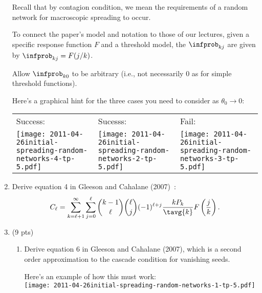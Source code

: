 \begin{enumerate}
  Recall that by contagion condition, we mean
  the requirements of a random network for
  macroscopic spreading to occur.

  To connect the paper's model and notation
  to those of our lectures,
  given a specific response function $F$
  and a threshold model,
  the $\infprob_{kj}$ are given by
  $\infprob_{kj} = F(j/k)$.

  Allow $\infprob_{k0}$ to be arbitrary (i.e., not necessarily
  0 as for simple threshold functions).

  Here's a graphical hint for the three cases 
  you need to consider as $\theta_{0} \rightarrow 0$:
  \begin{tabular}{lll}
    Success: &
    Sucesss: & 
    Fail: \\
    \texttt{[image: 2011-04-26initial-spreading-random-networks-4-tp-5.pdf]} &
    \texttt{[image: 2011-04-26initial-spreading-random-networks-2-tp-5.pdf]} &
    \texttt{[image: 2011-04-26initial-spreading-random-networks-3-tp-5.pdf]}
  \end{tabular}

  
   \solutionstart


   \solutionend

\item 
  Derive equation 4 in Gleeson and Cahalane (2007)~\cite{gleeson2007a}:
  $$
  C_{\ell}
  =
  \sum_{k=\ell+1}^{\infty}
  \sum_{j=0}^{\ell}
  \binom{k-1}{\ell}
  \binom{\ell}{j}
  (-1)^{\ell+j}
  \frac{k P_{k}}{\tavg{k}}
  F
  \left(
    \frac{j}{k}
  \right).
  $$

  
   \solutionstart


   \solutionend

\item (9 pts)

  \begin{enumerate}
  \item 
    Derive equation 6 in Gleeson and Cahalane (2007),
    which is a second order approximation to the
    cascade condition for vanishing seeds.

    Here's an example of how this must work:\\
    \texttt{[image: 2011-04-26initial-spreading-random-networks-1-tp-5.pdf]}

    
   \solutionstart



\end{enumerate}
\end{enumerate}
